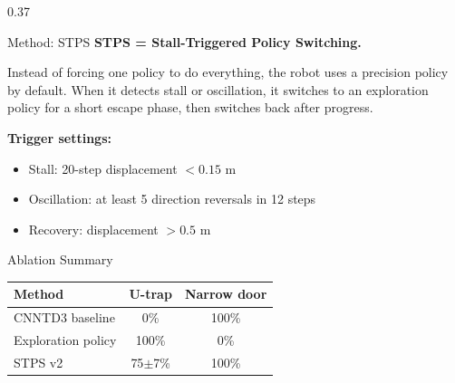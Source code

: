 \documentclass[final]{beamer}
\begin{document}
\begin{frame}[t]
\begin{columns}[t,totalwidth=\textwidth]
\begin{column}{0.37\textwidth}
  \begin{block}{Method: STPS}
    \justifying
    \textbf{STPS = Stall-Triggered Policy Switching.}

    Instead of forcing one policy to do everything, the robot uses a precision policy by default. When it detects stall or oscillation, it switches to an exploration policy for a short escape phase, then switches back after progress.

    \vspace{0.8em}
    \centering

    \vspace{0.8em}
    \textbf{Trigger settings:}
    \begin{itemize}[leftmargin=1.2em]
      \item Stall: 20-step displacement $< 0.15$ m
      \item Oscillation: at least 5 direction reversals in 12 steps
      \item Recovery: displacement $> 0.5$ m
    \end{itemize}
  \end{block}

  \begin{block}{Ablation Summary}
    \centering
    \begin{tabular}{lcc}
      \toprule
      Method & U-trap & Narrow door \\
      \midrule
      CNNTD3 baseline & 0\% & 100\% \\
      Exploration policy & 100\% & 0\% \\
      STPS v2 & 75$\pm$7\% & 100\% \\
      \bottomrule
    \end{tabular}


\end{block}
\end{column}
\end{columns}
\end{frame}
\end{document}
